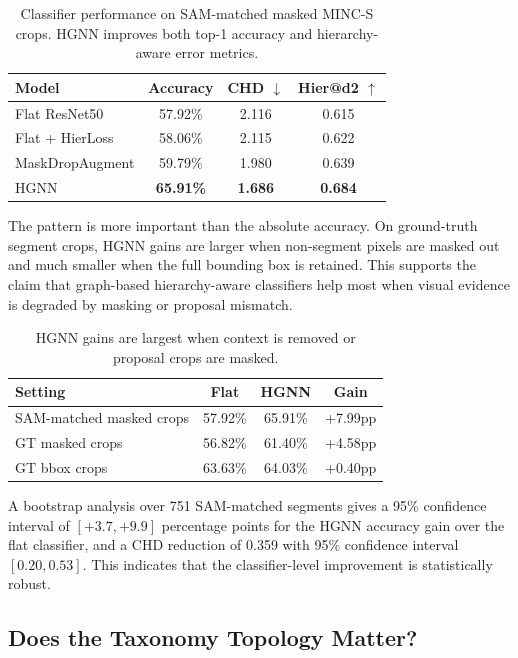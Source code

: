 \documentclass[11pt,twocolumn,letterpaper]{article}
\begin{document}
\begin{table}[t]
\centering
\small
\begin{tabular}{lccc}
\toprule
Model & Accuracy & CHD $\downarrow$ & Hier@d2 $\uparrow$ \\
\midrule
Flat ResNet50 & 57.92\% & 2.116 & 0.615 \\
Flat + HierLoss & 58.06\% & 2.115 & 0.622 \\
MaskDropAugment & 59.79\% & 1.980 & 0.639 \\
HGNN & \textbf{65.91\%} & \textbf{1.686} & \textbf{0.684} \\
\bottomrule
\end{tabular}
\caption{Classifier performance on SAM-matched masked MINC-S crops. HGNN improves both top-1 accuracy and hierarchy-aware error metrics.}
\label{tab:sam_matched_classification}
\end{table}

The pattern is more important than the absolute accuracy. On ground-truth segment crops, HGNN gains are larger when non-segment pixels are masked out and much smaller when the full bounding box is retained. This supports the claim that graph-based hierarchy-aware classifiers help most when visual evidence is degraded by masking or proposal mismatch.

\begin{table}[t]
\centering
\small
\begin{tabular}{lccc}
\toprule
Setting & Flat & HGNN & Gain \\
\midrule
SAM-matched masked crops & 57.92\% & 65.91\% & +7.99pp \\
GT masked crops & 56.82\% & 61.40\% & +4.58pp \\
GT bbox crops & 63.63\% & 64.03\% & +0.40pp \\
\bottomrule
\end{tabular}
\caption{HGNN gains are largest when context is removed or proposal crops are masked.}
\label{tab:context_loss_summary}
\end{table}

A bootstrap analysis over 751 SAM-matched segments gives a 95\% confidence interval of $[+3.7,+9.9]$ percentage points for the HGNN accuracy gain over the flat classifier, and a CHD reduction of 0.359 with 95\% confidence interval $[0.20,0.53]$. This indicates that the classifier-level improvement is statistically robust.

\subsection{Does the Taxonomy Topology Matter?}
\end{document}
